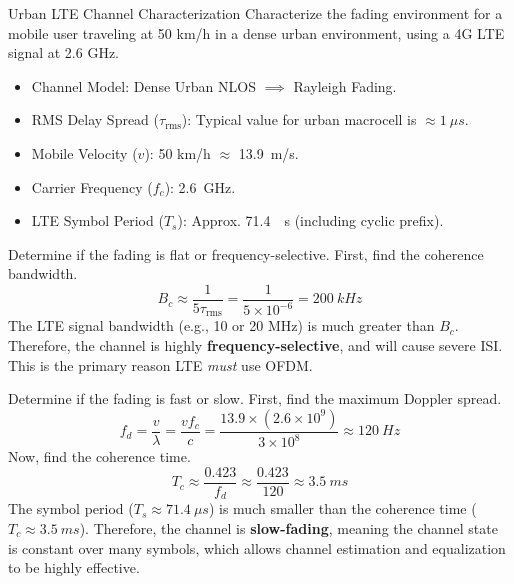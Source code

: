 \begin{workedexample}{Urban LTE Channel Characterization}
     Characterize the fading environment for a mobile user traveling at 50 km/h in a dense urban environment, using a 4G LTE signal at 2.6 GHz.
    \begin{itemize}
        \item Channel Model: Dense Urban NLOS $\implies$ Rayleigh Fading.
        \item RMS Delay Spread ($\tau_{\text{rms}}$): Typical value for urban macrocell is $\approx \qty{1}{\mu s}$.
        \item Mobile Velocity ($v$): 50 km/h $\approx$ \qty{13.9}{m/s}.
        \item Carrier Frequency ($f_c$): \qty{2.6}{GHz}.
        \item LTE Symbol Period ($T_s$): Approx. \qty{71.4}{\mu s} (including cyclic prefix).
    \end{itemize}
    \begin{derivationsteps}
        \step Determine if the fading is flat or frequency-selective. First, find the coherence bandwidth.
        \[ B_c \approx \frac{1}{5\tau_{\text{rms}}} = \frac{1}{5 \times 10^{-6}} = \qty{200}{kHz} \]
        The LTE signal bandwidth (e.g., 10 or 20 MHz) is much greater than $B_c$. Therefore, the channel is highly \textbf{frequency-selective}, and will cause severe ISI. This is the primary reason LTE \emph{must} use OFDM.
        
        \step Determine if the fading is fast or slow. First, find the maximum Doppler spread.
        \[ f_d = \frac{v}{\lambda} = \frac{v f_c}{c} = \frac{13.9 \times (2.6 \times 10^9)}{3 \times 10^8} \approx \qty{120}{Hz} \]
        Now, find the coherence time.
        \[ T_c \approx \frac{0.423}{f_d} \approx \frac{0.423}{120} \approx \qty{3.5}{ms} \]
        The symbol period ($T_s \approx \qty{71.4}{\mu s}$) is much smaller than the coherence time ($T_c \approx \qty{3.5}{ms}$). Therefore, the channel is \textbf{slow-fading}, meaning the channel state is constant over many symbols, which allows channel estimation and equalization to be highly effective.
    \end{derivationsteps}
\end{workedexample}



